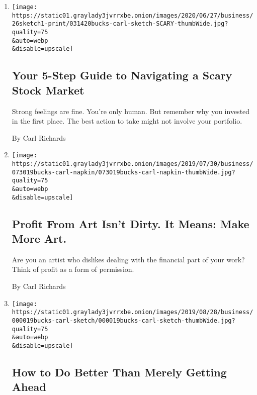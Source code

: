 \begin{enumerate}
\def\labelenumi{\arabic{enumi}.}
\item
  \href{/2020/06/26/business/investing-stock-market-fear.html}{}

  \texttt{[image: https://static01.graylady3jvrrxbe.onion/images/2020/06/27/business/26sketch1-print/031420bucks-carl-sketch-SCARY-thumbWide.jpg?quality=75\\\&auto=webp\\\&disable=upscale]}

  \hypertarget{your-5-step-guide-to-navigating-a-scary-stock-market}{%
  \subsection{Your 5-Step Guide to Navigating a Scary Stock
  Market}\label{your-5-step-guide-to-navigating-a-scary-stock-market}}

  Strong feelings are fine. You're only human. But remember why you
  invested in the first place. The best action to take might not involve
  your portfolio.

  By Carl Richards
\item
  \href{/2019/10/25/your-money/profit-art-business.html}{}

  \texttt{[image: https://static01.graylady3jvrrxbe.onion/images/2019/07/30/business/073019bucks-carl-napkin/073019bucks-carl-napkin-thumbWide.jpg?quality=75\\\&auto=webp\\\&disable=upscale]}

  \hypertarget{profit-from-art-isnt-dirty-it-means-make-more-art}{%
  \subsection{Profit From Art Isn't Dirty. It Means: Make More
  Art.}\label{profit-from-art-isnt-dirty-it-means-make-more-art}}

  Are you an artist who dislikes dealing with the financial part of your
  work? Think of profit as a form of permission.

  By Carl Richards
\item
  \href{/2019/09/12/your-money/how-to-do-better-than-merely-getting-ahead.html}{}

  \texttt{[image: https://static01.graylady3jvrrxbe.onion/images/2019/08/28/business/000019bucks-carl-sketch/000019bucks-carl-sketch-thumbWide.jpg?quality=75\\\&auto=webp\\\&disable=upscale]}

  \hypertarget{how-to-do-better-than-merely-getting-ahead}{%
  \subsection{How to Do Better Than Merely Getting
  Ahead}\label{how-to-do-better-than-merely-getting-ahead}}


\end{enumerate}
